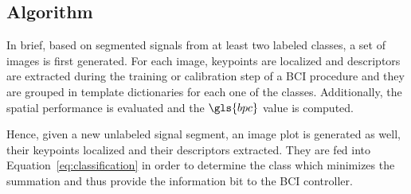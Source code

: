 
\subsection{Algorithm}

In brief, based on segmented signals from at least two labeled classes, a set of images is first generated.  For each image, keypoints are localized and descriptors are extracted during the training or calibration step of a BCI procedure and they are grouped in template dictionaries for each one of the classes.  Additionally, the spatial performance is evaluated and the $\gls{bpc}$ value is computed.

Hence, given a new unlabeled signal segment, an image plot is generated as well, their keypoints localized and their descriptors extracted.  They are fed into Equation~\ref{eq:classification} in order to determine the class which minimizes the summation and thus provide the information bit to the BCI controller.  

